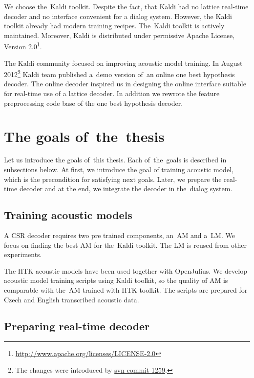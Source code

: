 We choose the~Kaldi toolkit. Despite the fact,  that Kaldi had no lattice real-time decoder
and no interface convenient for a dialog system.
However, the Kaldi toolkit already had modern training recipes.
The~Kaldi toolkit is actively maintained. Moreover, Kaldi is distributed 
under permissive Apache License, Version 2.0\footnote{\url{http://www.apache.org/licenses/LICENSE-2.0}}.

The Kaldi community focused on improving acoustic model training. 
In August 2012\footnote{The changes were introduced by \href{https://sourceforge.net/p/kaldi/code/1259/}{svn commit 1259}.}
Kaldi team published a~demo version of~an online one best hypothesis decoder.
The online decoder inspired us in designing 
the online interface suitable for real-time use of a lattice decoder.
In addition we rewrote the feature preprocessing code base of the one best hypothesis decoder.

\section{The goals of~the~thesis} 
\label{sec:goals}
Let us introduce the goals of~this thesis. Each of~the~goals is described in subsections below.
At first, we introduce the goal of training acoustic model, which is the precondition for satisfying next goals.
Later, we prepare the real-time decoder and at the end, we integrate the decoder in the~dialog system. 

\subsection{Training acoustic models} 
\label{sub:training_kaldi_acoustic_models}
A \acl{CSR} decoder requires two pre trained components, an~\acl{AM} and 
a~\acl{LM}. We focus on finding the best \acl{AM} for the~Kaldi toolkit. 
The \acl{LM} is reused from other experiments.

The \ac{HTK} acoustic models have been used together with OpenJulius. 
We develop acoustic model training scripts using Kaldi toolkit,
so the quality of \ac{AM} is comparable with the~\ac{AM} trained with \ac{HTK} toolkit. 
The scripts are prepared for Czech and English transcribed acoustic data.

 

\subsection{Preparing real-time decoder} 
\label{sub:compare_rt}

